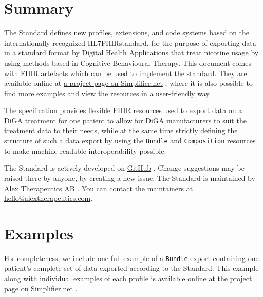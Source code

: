 \documentclass{report}
\def\code#1{\texttt{#1}} %
\newcommand{\fhir}{FHIR\textsuperscript{\textregistered}}
\newcommand{\hl}{HL7\textsuperscript{\textregistered}}
\begin{document}
\chapter{Summary}
\label{ch:sum}

The Standard defines new profiles, extensions, and code systems based on the internationally recognized \hl \fhir standard, 
for the purpose of exporting data in a standard format by Digital Health Applications that treat nicotine usage by using methods based in Cognitive Behavioural Therapy.
This document comes with FHIR artefacts which can be used to implement the standard. They are available online at \href{https://simplifier.net/treat-nicotine-usage-diga}{a project page on Simplifier.net} \cite{project}, where
it is also possible to find more examples and view the resources in a user-friendly way.

The specification provides flexible FHIR resources used to export data on a DiGA treatment for one patient to allow for DiGA manufacturers to suit the treatment data to their needs, 
while at the same time strictly defining the structure of such a data export by using the \code{Bundle} and \code{Composition} resources to make machine-readable interoperability possible.

The Standard is actively developed on \href{https://github.com/alex-therapeutics/diga-nicotine-usage-fhir}{GitHub} \cite{github}. Change suggestions may be raised there by anyone, by creating a new issue.
The Standard is maintained by \href{https://www.alextherapeutics.com}{Alex Therapeutics AB} \cite{alex}. You can contact the maintainers at \href{mailto:hello@alextherapeutics.com}{hello@alextherapeutics.com}.

\printbibliography[heading=bibintoc, title={References}]

\appendix

\chapter{Examples}
\label{app:ex}

For completeness, we include one full example of a \code{Bundle} export containing one patient's complete set of data exported according to the Standard.
This example along with individual examples of each profile is available online at the \href{https://simplifier.net/treat-nicotine-usage-diga}{project page on Simplifier.net} \cite{project}.


% 
\end{document}
